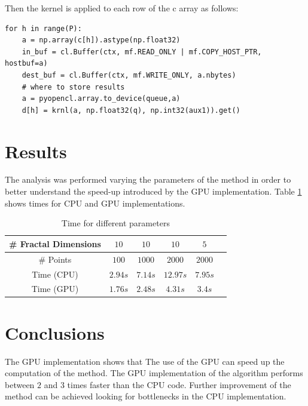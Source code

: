 \documentclass[oneside,a4paper,english,links]{article}
\begin{document}
Then the kernel is applied to each row of the c array as follows:

\begin{verbatim}
for h in range(P):        
    a = np.array(c[h]).astype(np.float32)
    in_buf = cl.Buffer(ctx, mf.READ_ONLY | mf.COPY_HOST_PTR, hostbuf=a)
    dest_buf = cl.Buffer(ctx, mf.WRITE_ONLY, a.nbytes)
    # where to store results      
    a = pyopencl.array.to_device(queue,a)
    d[h] = krnl(a, np.float32(q), np.int32(aux1)).get()  
\end{verbatim}
\section{Results}
The analysis was performed varying the parameters of the method in order to better understand the speed-up introduced by the GPU implementation. Table \ref{table:tableFirstTest} shows times for CPU and GPU implementations.

\begin{table}[htb]
\centering
\begin{tabular}{|c|c|c|c|c|c|}
    \hline
    \# Fractal Dimensions & $10$ & $10$ & $10$ & $5$ \\
    \hline
    \# Points & $100$ & $1000$ & $2000$ & $2000$ \\
    \hline
    Time (CPU)  & $2.94s$ & $7.14s$ & $12.97s$ & $7.95s$\\
    \hline
    Time (GPU) & $1.76s$ & $2.48s$ & $4.31s$ & $3.4s$ \\
    \hline
\end{tabular}
\caption{Time for different parameters}
\label{table:tableFirstTest}
\end{table}


\section{Conclusions}

The GPU implementation shows that The use of the GPU can speed up the computation of the method. The GPU implementation of the algorithm performs between $2$ and $3$ times faster than the CPU code. Further improvement of the method can be achieved looking for bottlenecks in the CPU implementation.




\end{document}
